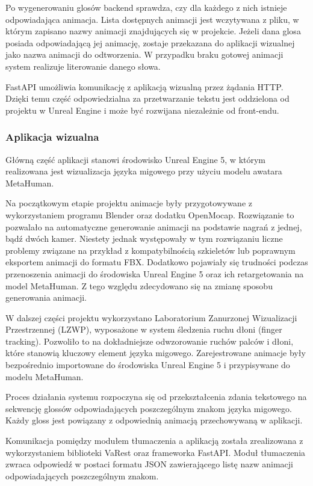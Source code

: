 \documentclass[12pt]{article}
\begin{document}
Po wygenerowaniu glosów backend sprawdza, czy dla każdego z nich istnieje odpowiadająca animacja. Lista dostępnych animacji jest wczytywana z pliku, w którym zapisano nazwy animacji znajdujących się w projekcie. Jeżeli dana glosa posiada odpowiadającą jej animację, zostaje przekazana do aplikacji wizualnej jako nazwa animacji do odtworzenia. W przypadku braku gotowej animacji system realizuje literowanie danego słowa.

FastAPI umożliwia komunikację z aplikacją wizualną przez żądania HTTP. Dzięki temu część odpowiedzialna za przetwarzanie tekstu jest oddzielona od projektu w Unreal Engine i może być rozwijana niezależnie od front-endu.

\subsubsection{Aplikacja wizualna}

Główną część aplikacji stanowi środowisko Unreal Engine 5, w którym realizowana jest wizualizacja języka migowego przy użyciu modelu awatara MetaHuman.

Na początkowym etapie projektu animacje były przygotowywane z wykorzystaniem programu Blender oraz dodatku OpenMocap. Rozwiązanie to pozwalało na automatyczne generowanie animacji na podstawie nagrań z jednej, bądź dwóch kamer. Niestety jednak występowały w tym rozwiązaniu liczne problemy związane na przykład z kompatybilnością szkieletów lub poprawnym eksportem animacji do formatu FBX. Dodatkowo pojawiały się trudności podczas przenoszenia animacji do środowiska Unreal Engine 5 oraz ich retargetowania na model MetaHuman. Z tego względu zdecydowano się na zmianę sposobu generowania animacji.
 
W dalszej części projektu wykorzystano Laboratorium Zanurzonej Wizualizacji Przestrzennej (LZWP), wyposażone w system śledzenia ruchu dłoni (finger tracking). Pozwoliło to na dokładniejsze odwzorowanie ruchów palców i dłoni, które stanowią kluczowy element języka migowego. Zarejestrowane animacje były bezpośrednio importowane do środowiska Unreal Engine 5 i przypisywane do modelu MetaHuman.

 
Proces działania systemu rozpoczyna się od przekształcenia zdania tekstowego na sekwencję glossów odpowiadających poszczególnym znakom języka migowego. Każdy gloss jest powiązany z odpowiednią animacją przechowywaną w aplikacji.

Komunikacja pomiędzy modułem tłumaczenia a aplikacją została zrealizowana z wykorzystaniem biblioteki VaRest oraz frameworka FastAPI. Moduł tłumaczenia zwraca odpowiedź w postaci formatu JSON zawierającego listę nazw animacji odpowiadających poszczególnym znakom.
\end{document}
